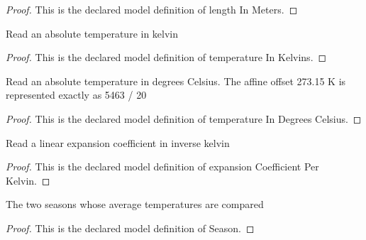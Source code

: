 \begin{proof}
  This is the declared model definition of length In Meters.
\end{proof}
\begin{definition}
  \label{def:physics:phyx-mini-0483:phyxminiproblems-problemphyxmini0483-temperatureinkelvins}
  Read an absolute temperature in kelvin
\end{definition}
\begin{proof}
  This is the declared model definition of temperature In Kelvins.
\end{proof}
\begin{definition}
  \label{def:physics:phyx-mini-0483:phyxminiproblems-problemphyxmini0483-temperatureindegreescelsius}
  Read an absolute temperature in degrees Celsius. The affine offset 273.15 K is represented exactly as 5463 / 20
\end{definition}
\begin{proof}
  This is the declared model definition of temperature In Degrees Celsius.
\end{proof}
\begin{definition}
  \label{def:physics:phyx-mini-0483:phyxminiproblems-problemphyxmini0483-expansioncoefficientperkelvin}
  Read a linear expansion coefficient in inverse kelvin
\end{definition}
\begin{proof}
  This is the declared model definition of expansion Coefficient Per Kelvin.
\end{proof}
\begin{definition}[Season]
  \label{def:physics:phyx-mini-0483:phyxminiproblems-problemphyxmini0483-season}
  The two seasons whose average temperatures are compared
\end{definition}
\begin{proof}
  This is the declared model definition of Season.
\end{proof}
